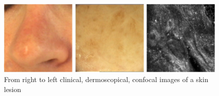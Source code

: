 \begin{figure}
    \centerline{\includegraphics[width=1\columnwidth]{02-related-works/figures/sample-clsm-images.png}}
    \caption{From right to left clinical, dermoscopical, confocal images of a skin lesion \cite{ruini2016invisible}}
    \label{figure:sample-clsm-images}
\end{figure}